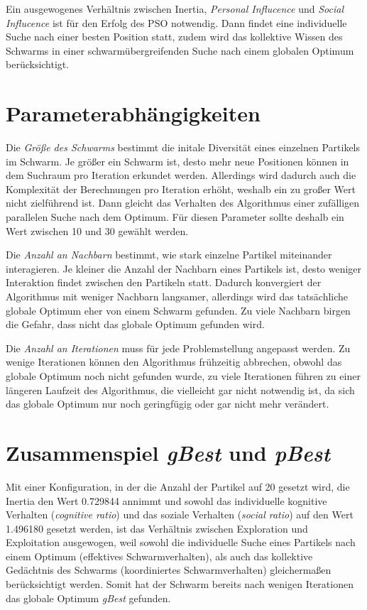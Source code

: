 Ein ausgewogenes Verhältnis zwischen Inertia, \emph{Personal Influcence} und
\emph{Social Influcence} ist für den Erfolg des PSO notwendig. Dann findet
eine individuelle Suche nach einer besten Position statt, zudem wird das
kollektive Wissen des Schwarms in einer schwarmübergreifenden Suche nach
einem globalen Optimum berücksichtigt.

\section{Parameterabhängigkeiten}

Die \emph{Größe des Schwarms} bestimmt die initale Diversität eines einzelnen
Partikels im Schwarm. Je größer ein Schwarm ist, desto mehr neue Positionen
können in dem Suchraum pro Iteration erkundet werden. Allerdings wird dadurch
auch die Komplexität der Berechnungen pro Iteration erhöht, weshalb ein zu
großer Wert nicht zielführend ist. Dann gleicht das Verhalten des Algorithmus
einer zufälligen parallelen Suche nach dem Optimum. Für diesen Parameter sollte
deshalb ein Wert zwischen 10 und 30 gewählt werden.

Die \emph{Anzahl an Nachbarn} bestimmt, wie stark einzelne Partikel miteinander
interagieren. Je kleiner die Anzahl der Nachbarn eines Partikels ist, desto
weniger Interaktion findet zwischen den Partikeln statt. Dadurch konvergiert
der Algorithmus mit weniger Nachbarn langsamer, allerdings wird das
tatsächliche globale Optimum eher von einem Schwarm gefunden. Zu viele
Nachbarn birgen die Gefahr, dass nicht das globale Optimum gefunden wird.

Die \emph{Anzahl an Iterationen} muss für jede Problemstellung angepasst
werden. Zu wenige Iterationen können den Algorithmus frühzeitig abbrechen,
obwohl das globale Optimum noch nicht gefunden wurde, zu viele Iterationen
führen zu einer längeren Laufzeit des Algorithmus, die vielleicht gar nicht
notwendig ist, da sich das globale Optimum nur noch geringfügig oder gar nicht
mehr verändert.

\section{Zusammenspiel \emph{gBest} und \emph{pBest}}

Mit einer Konfiguration, in der die Anzahl der Partikel auf 20 gesetzt wird,
die Inertia den Wert 0.729844 annimmt und sowohl das individuelle kognitive
Verhalten (\emph{cognitive ratio}) und das soziale Verhalten
(\emph{social ratio}) auf den Wert 1.496180 gesetzt werden, ist das Verhältnis
zwischen Exploration und Exploitation ausgewogen, weil sowohl die individuelle
Suche eines Partikels nach einem Optimum (effektives Schwarmverhalten), als
auch das kollektive Gedächtnis des Schwarms (koordiniertes Schwarmverhalten)
gleichermaßen berücksichtigt werden.
Somit hat der Schwarm bereits nach wenigen Iterationen das globale Optimum
\emph{gBest} gefunden.

